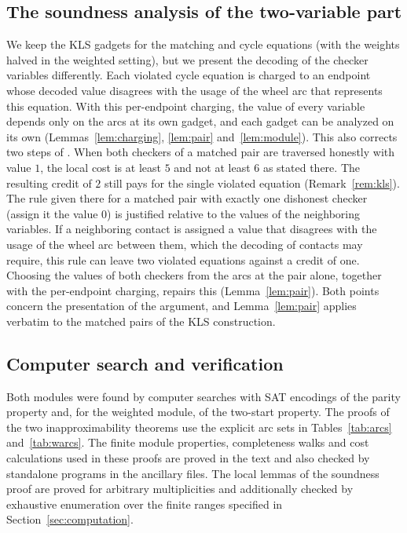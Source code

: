\documentclass[11pt]{amsart}
\theoremstyle{definition}
\theoremstyle{remark}
\numberwithin{equation}{section}
\begin{document}
\subsection*{The soundness analysis of the two-variable part}
We keep the KLS gadgets for the matching and cycle equations (with the weights halved in the weighted setting), but we present the decoding of the checker variables differently. Each violated cycle equation is charged to an endpoint whose decoded value disagrees with the usage of the wheel arc that represents this equation. With this per-endpoint charging, the value of every variable depends only on the arcs at its own gadget, and each gadget can be analyzed on its own (Lemmas~\ref{lem:charging}, \ref{lem:pair} and~\ref{lem:module}). This also corrects two steps of \cite[\S6.3]{KLS15}. When both checkers of a matched pair are traversed honestly with value $1$, the local cost is at least $5$ and not at least $6$ as stated there. The resulting credit of $2$ still pays for the single violated equation (Remark~\ref{rem:kls}). The rule given there for a matched pair with exactly one dishonest checker (assign it the value $0$) is justified relative to the values of the neighboring variables. If a neighboring contact is assigned a value that disagrees with the usage of the wheel arc between them, which the decoding of contacts may require, this rule can leave two violated equations against a credit of one. Choosing the values of both checkers from the arcs at the pair alone, together with the per-endpoint charging, repairs this (Lemma~\ref{lem:pair}). Both points concern the presentation of the argument, and Lemma~\ref{lem:pair} applies verbatim to the matched pairs of the KLS construction.

\subsection*{Computer search and verification}
Both modules were found by computer searches with SAT encodings of the parity property and, for the weighted module, of the two-start property. The proofs of the two inapproximability theorems use the explicit arc sets in Tables~\ref{tab:arcs} and~\ref{tab:warcs}. The finite module properties, completeness walks and cost calculations used in these proofs are proved in the text and also checked by standalone programs in the ancillary files. The local lemmas of the soundness proof are proved for arbitrary multiplicities and additionally checked by exhaustive enumeration over the finite ranges specified in Section~\ref{sec:computation}.
\end{document}

